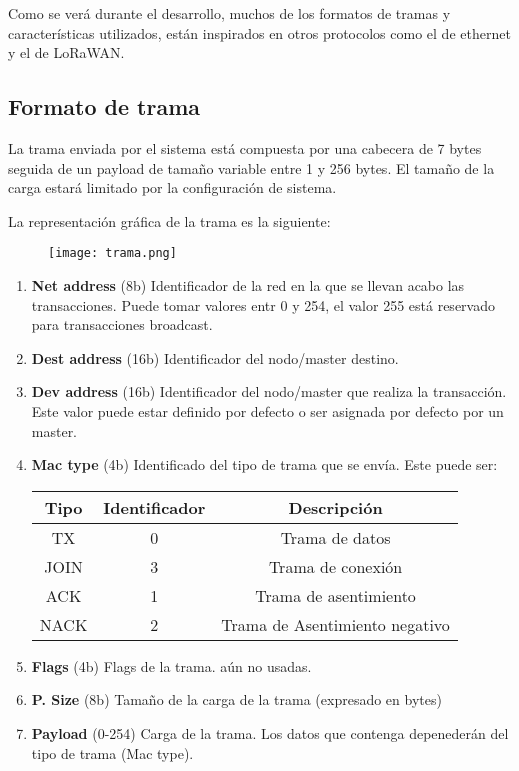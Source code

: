Como se verá durante el desarrollo, muchos de los formatos de tramas y características utilizados, están inspirados en otros protocolos como el de ethernet y el de LoRaWAN.  

\subsection{Formato de trama}

La trama enviada por el sistema está compuesta por una cabecera de 7 bytes seguida de un payload de tamaño variable entre 1 y 256 bytes. El tamaño de la carga estará limitado por la configuración de sistema.

La representación gráfica de la trama es la siguiente:
\begin{figure}[!h]
	\texttt{[image: trama.png]}
	\centering
	
\end{figure}
\begin{enumerate}
	\item \textbf{Net address } (8b) Identificador de la red en la que se llevan acabo las transacciones. Puede tomar valores entr 0 y 254, el valor 255 está reservado para transacciones broadcast.
	\item \textbf{Dest address } (16b) Identificador del nodo/master destino. 
	\item \textbf{Dev address } (16b) Identificador del nodo/master que realiza la transacción. Este valor puede estar definido por defecto o ser asignada por defecto por un master.
	\item \textbf{Mac type } (4b) Identificado del tipo de trama que se envía. Este puede ser:
	\begin{center}
		\begin{tabular}{|c c c|}
			\hline
			Tipo & Identificador & Descripción \\
			\hline \hline
			TX   & 0 & Trama de datos \\
			JOIN & 3 & Trama de conexión \\
			ACK  & 1 & Trama de asentimiento \\
			NACK & 2 & Trama de Asentimiento negativo \\
			\hline 
	\end{tabular}
	\end{center}
	\item \textbf{Flags } (4b) Flags de la trama. aún no usadas.
	\item \textbf{P. Size } (8b) Tamaño de la carga de la trama (expresado en bytes)
	\item \textbf{Payload } (0-254) Carga de la trama. Los datos que contenga depenederán del tipo de trama (Mac type). 
	
	\end{enumerate}


